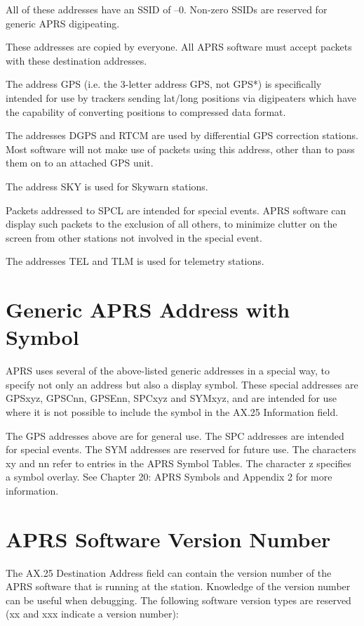 All of these addresses have an SSID of –0. Non-zero SSIDs are reserved for
generic APRS digipeating.

These addresses are copied by everyone. All APRS software must accept
packets with these destination addresses.

The address GPS (i.e. the 3-letter address GPS, not GPS*) is specifically
intended for use by trackers sending lat/long positions via digipeaters which
have the capability of converting positions to compressed data format.

The addresses DGPS and RTCM are used by differential GPS correction
stations. Most software will not make use of packets using this address, other
than to pass them on to an attached GPS unit.

The address SKY is used for Skywarn stations.

Packets addressed to SPCL are intended for special events. APRS software
can display such packets to the exclusion of all others, to minimize clutter on
the screen from other stations not involved in the special event.

The addresses TEL and TLM is used for telemetry stations.

\section{Generic APRS Address with Symbol}

APRS uses several of the above-listed generic addresses in a special way, to
specify not only an address but also a display symbol. These special
addresses are GPSxyz, GPSCnn, GPSEnn, SPCxyz and SYMxyz, and are
intended for use where it is not possible to include the symbol in the AX.25
Information field.

The GPS addresses above are for general use.
The SPC addresses are intended for special events.
The SYM addresses are reserved for future use.
The characters xy and nn refer to entries in the APRS Symbol Tables. The
character z specifies a symbol overlay. See Chapter 20: APRS Symbols and
Appendix 2 for more information.

\section{APRS Software Version Number}

The AX.25 Destination Address field can contain the version number of the
APRS software that is running at the station. Knowledge of the version
number can be useful when debugging.
The following software version types are reserved (xx and xxx indicate a
version number):

